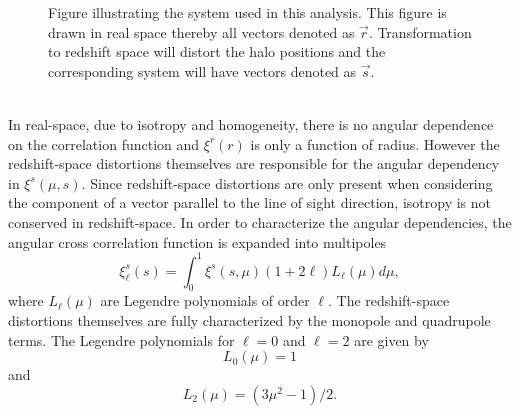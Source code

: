 \begin{figure}
    
    \caption{Figure illustrating the system used in this analysis. This
    figure is drawn in real space thereby all vectors denoted as $\vec{r}$.
    Transformation to redshift space will distort the halo positions and the
    corresponding system will have vectors denoted as $\vec{s}$.}
    \label{fig:corrpair}
\end{figure}
\\\indent
In real-space, due to isotropy and homogeneity, there is no angular dependence on the correlation function and $\xi^r(r)$ is only a function of radius. However the redshift-space distortions themselves are responsible for the angular dependency in $\xi^s(\mu,s)$. Since redshift-space distortions are only present when considering the component of a vector parallel to the line of sight direction, isotropy is not conserved in redshift-space. In order to characterize the angular dependencies, the angular cross correlation function is expanded into multipoles\cite{Nadathur_corr}
\begin{equation}
    \xi^s_\ell(s)=\int_0^1\xi^s(s,\mu)(1+2\ell)L_\ell(\mu)d\mu,
\end{equation}
where $L_\ell(\mu)$ are Legendre polynomials
of order $\ell$. The redshift-space distortions themselves are fully characterized by the monopole and quadrupole terms\cite{Hamaus_2017}. The Legendre polynomials for $\ell=0$ and
$\ell=2$ are given by
\begin{equation}
    L_0(\mu)=1
\end{equation}
and
\begin{equation}
    L_2(\mu)=(3\mu^2-1)/2.
\end{equation}
